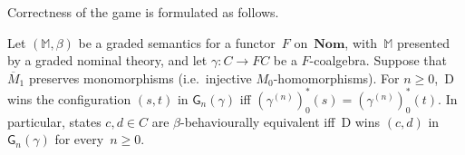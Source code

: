 \documentclass[a4paper,UKenglish,cleveref,thm-restate,numberwithinsect,final]{lipics-v2021}
\newcommand{\Perm}{\mathsf{Perm}(\Names)}
\newcommand{\game}{\mathsf{G}}
\newcommand{\Names}{\mathbb{A}}
\newcommand{\mbar}{\overline{M}_1}
\theoremstyle{plain}
\numberwithin{equation}{section}
\newcommand{\monad}{{\mathbb{M}}}
\newcommand{\+}[1]{\mathcal{#1}\xspace}
\newcommand{\Nom}{\mathbf{Nom}}
\theoremstyle{definition}
\begin{document}
Correctness of the game is formulated as follows.
\begin{theorem} \label{thm:games} Let
  $(\monad,\beta)$ be a graded semantics for a functor~$F$ on~$\Nom$,
  with~$\monad$ presented by a graded nominal theory, and let
  $\gamma\colon C\to FC$ be a $F$-coalgebra. Suppose that~$\mbar$
  preserves monomorphisms (i.e.~injective $M_0$-homomorphisms). For
  $n\ge 0$,~D wins the configuration $(s,t)$ in $\game_n(\gamma)$ iff
  $(\gamma^{(n)})^*_0(s)=(\gamma^{(n)})^*_0(t)$.
  In particular, states $c,d\in C$ are $\beta$-behaviourally
  equivalent iff~D wins $(c,d)$ in $\game_n(\gamma)$ for
  every~$n\ge 0$.
\end{theorem}
\end{document}

